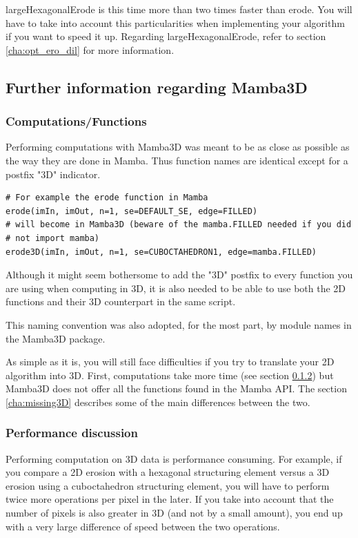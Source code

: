 \documentclass[a4paper,10pt,oneside]{article}
\begin{document}
largeHexagonalErode is this time more than two times faster than erode. You will
have to take into account this particularities when implementing your algorithm
if you want to speed it up. Regarding largeHexagonalErode, refer to section 
\ref{cha:opt_ero_dil} for more information.

\pagebreak

\subsection{Further information regarding Mamba3D}

\subsubsection{Computations/Functions}

Performing computations with Mamba3D was meant to be as close as possible
as the way they are done in Mamba. Thus function names are identical except
for a postfix "3D" indicator.

\lstset{language=Python}
\begin{lstlisting}
# For example the erode function in Mamba
erode(imIn, imOut, n=1, se=DEFAULT_SE, edge=FILLED)
# will become in Mamba3D (beware of the mamba.FILLED needed if you did 
# not import mamba)
erode3D(imIn, imOut, n=1, se=CUBOCTAHEDRON1, edge=mamba.FILLED)
\end{lstlisting}

Although it might seem bothersome to add the "3D" postfix to every
function you are using when computing in 3D, it is also needed to be able to
use both the 2D functions and their 3D counterpart in the same script.

This naming convention was also adopted, for the most part, by module
names in the Mamba3D package.

As simple as it is, you will still face difficulties if you try to translate
your 2D algorithm into 3D. First, computations take more time (see section
\ref{cha:perfo3D}) but Mamba3D does not offer all the functions found in
the Mamba API. The section \ref{cha:missing3D} describes some of the 
main differences between the two.

\subsubsection{Performance discussion}
\label{cha:perfo3D}

Performing computation on 3D data is performance consuming. For example, if
you compare a 2D erosion with a hexagonal structuring element versus a 3D
erosion using a cuboctahedron structuring element, you will have to perform
twice more operations per pixel in the later. If you take into account that
the number of pixels is also greater in 3D (and not by a small amount), you end
up with a very large difference of speed between the two operations.
\end{document}
